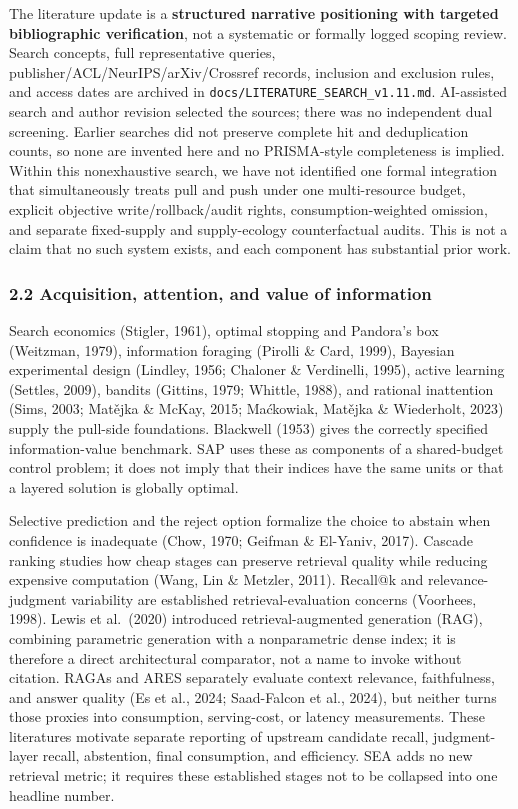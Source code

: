 \documentclass[
  11pt]{article}
\begin{document}
The literature update is a \textbf{structured narrative positioning with
targeted bibliographic verification}, not a systematic or formally
logged scoping review. Search concepts, full representative queries,
publisher/ACL/NeurIPS/arXiv/Crossref records, inclusion and exclusion
rules, and access dates are archived in
\texttt{docs/LITERATURE\_SEARCH\_v1.11.md}. AI-assisted search and
author revision selected the sources; there was no independent dual
screening. Earlier searches did not preserve complete hit and
deduplication counts, so none are invented here and no PRISMA-style
completeness is implied. Within this nonexhaustive search, we have not
identified one formal integration that simultaneously treats pull and
push under one multi-resource budget, explicit objective
write/rollback/audit rights, consumption-weighted omission, and separate
fixed-supply and supply-ecology counterfactual audits. This is not a
claim that no such system exists, and each component has substantial
prior work.

\subsubsection{2.2 Acquisition, attention, and value of
information}\label{acquisition-attention-and-value-of-information}

Search economics (Stigler, 1961), optimal stopping and Pandora's box
(Weitzman, 1979), information foraging (Pirolli \& Card, 1999), Bayesian
experimental design (Lindley, 1956; Chaloner \& Verdinelli, 1995),
active learning (Settles, 2009), bandits (Gittins, 1979; Whittle, 1988),
and rational inattention (Sims, 2003; Matějka \& McKay, 2015; Maćkowiak,
Matějka \& Wiederholt, 2023) supply the pull-side foundations. Blackwell
(1953) gives the correctly specified information-value benchmark. SAP
uses these as components of a shared-budget control problem; it does not
imply that their indices have the same units or that a layered solution
is globally optimal.

Selective prediction and the reject option formalize the choice to
abstain when confidence is inadequate (Chow, 1970; Geifman \& El-Yaniv,
2017). Cascade ranking studies how cheap stages can preserve retrieval
quality while reducing expensive computation (Wang, Lin \& Metzler,
2011). Recall@k and relevance-judgment variability are established
retrieval-evaluation concerns (Voorhees, 1998). Lewis et al.~(2020)
introduced retrieval-augmented generation (RAG), combining parametric
generation with a nonparametric dense index; it is therefore a direct
architectural comparator, not a name to invoke without citation. RAGAs
and ARES separately evaluate context relevance, faithfulness, and answer
quality (Es et al., 2024; Saad-Falcon et al., 2024), but neither turns
those proxies into consumption, serving-cost, or latency measurements.
These literatures motivate separate reporting of upstream candidate
recall, judgment-layer recall, abstention, final consumption, and
efficiency. SEA adds no new retrieval metric; it requires these
established stages not to be collapsed into one headline number.
\end{document}
